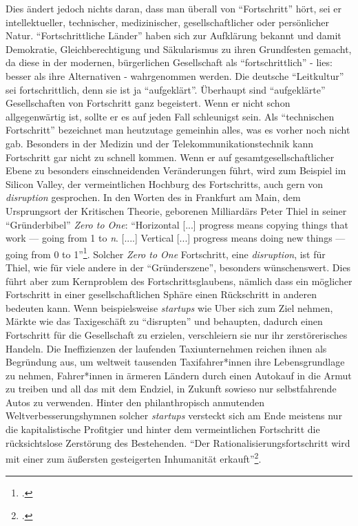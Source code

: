\documentclass[a4paper, 12pt]{article}
\begin{document}
\begin{onehalfspace}
Dies ändert jedoch nichts daran, dass man überall von "`Fortschritt"' hört, sei er intellektueller, technischer, medizinischer, gesellschaftlicher oder persönlicher Natur. "`Fortschrittliche Länder"' haben sich zur Aufklärung bekannt und damit Demokratie, Gleichberechtigung und Säkularismus zu ihren Grundfesten gemacht, da diese in der modernen, bürgerlichen Gesellschaft als "`fortschrittlich"' - lies: besser als ihre Alternativen - wahrgenommen werden. Die deutsche "`Leitkultur"' sei fortschrittlich, denn sie ist ja "`aufgeklärt"'. Überhaupt sind "`aufgeklärte"' Gesellschaften von Fortschritt ganz begeistert. Wenn er nicht schon allgegenwärtig ist, sollte er es auf jeden Fall schleunigst sein. Als "`technischen Fortschritt"' bezeichnet man heutzutage gemeinhin alles, was es vorher noch nicht gab. Besonders in der Medizin und der Telekommunikationstechnik kann Fortschritt gar nicht zu schnell kommen. Wenn er auf gesamtgesellschaftlicher Ebene zu besonders einschneidenden Veränderungen führt, wird zum Beispiel im Silicon Valley, der vermeintlichen Hochburg des Fortschritts, auch gern von \emph{disruption} gesprochen. In den Worten des in Frankfurt am Main, dem Ursprungsort der Kritischen Theorie, geborenen Milliardärs Peter Thiel in seiner "`Gründerbibel"' \emph{Zero to One}: "`Horizontal [...] progress means copying things that work — going from 1 to \emph{n}. [....] Vertical [...] progress means doing new things — going from 0 to 1"'\footnote{\Cite[Siehe][S. 6]{thiel}.}. Solcher \emph{Zero to One} Fortschritt, eine \emph{disruption}, ist für Thiel, wie für viele andere in der "`Gründerszene"', besonders wünschenswert. Dies führt aber zum Kernproblem des Fortschrittsglaubens, nämlich dass ein möglicher Fortschritt in einer gesellschaftlichen Sphäre einen Rückschritt in anderen bedeuten kann. Wenn beispielsweise \emph{startups} wie Uber sich zum Ziel nehmen, Märkte wie das Taxigeschäft zu "`disrupten"' und behaupten, dadurch einen Fortschritt für die Gesellschaft zu erzielen, verschleiern sie nur ihr zerstörerisches Handeln. Die Ineffizienzen der laufenden Taxiunternehmen reichen ihnen als Begründung aus, um weltweit tausenden Taxifahrer*innen ihre Lebensgrundlage zu nehmen, Fahrer*innen in ärmeren Ländern durch einen Autokauf in die Armut zu treiben und all das mit dem Endziel, in Zukunft sowieso nur selbstfahrende Autos zu verwenden. Hinter den philanthropisch anmutenden Weltverbesserungshymnen solcher \emph{startups} versteckt sich am Ende meistens nur die kapitalistische Profitgier und hinter dem vermeintlichen Fortschritt die rücksichtslose Zerstörung des Bestehenden. "`Der Rationalisierungsfortschritt wird mit einer zum äußersten gesteigerten Inhumanität erkauft"'\footnote{\Cite[Siehe][S. 389]{hetzel2011adorno}.}.


\end{onehalfspace}
\end{document}

